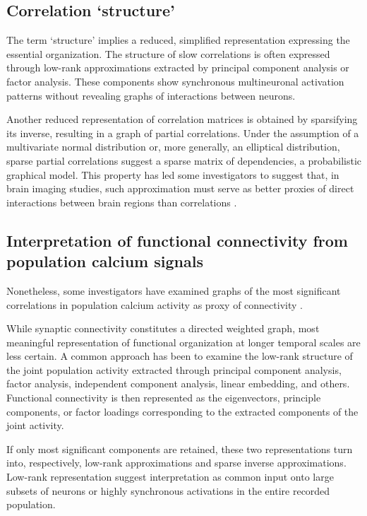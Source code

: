 \documentclass[10pt]{article}
\begin{document}
\subsection*{Correlation `structure'}
The term `structure' implies a reduced, simplified representation expressing the essential organization.  The structure of slow correlations is often expressed through low-rank approximations extracted by principal component analysis or factor analysis. These components show synchronous multineuronal activation patterns without revealing graphs of interactions between neurons. 

Another reduced representation of correlation matrices is obtained by sparsifying its inverse, resulting in a graph of partial correlations. Under the assumption of a multivariate normal distribution or, more generally, an elliptical distribution, sparse partial correlations suggest a sparse matrix of dependencies, a probabilistic graphical model. This property has led some investigators to suggest that, in brain imaging studies, such approximation must serve as better proxies of direct interactions between brain regions than correlations \cite{Varoquaux:2012,Ryali:2012}. 


\subsection*{Interpretation of functional connectivity from population calcium signals}
Nonetheless, some investigators have examined graphs of the most significant correlations in population calcium activity as proxy of connectivity \cite{Malmersjo:2013}.  

While synaptic connectivity constitutes a directed weighted graph, most meaningful representation of functional organization at longer temporal scales are less certain. A common approach has been to examine the low-rank structure of the joint population activity extracted through principal component analysis, factor analysis, independent component analysis, linear embedding, and others. Functional connectivity is then represented as the eigenvectors, principle components, or factor loadings corresponding to the extracted components of the joint activity. 

If only most significant components are retained, these two representations turn into, respectively, low-rank approximations and sparse inverse approximations. Low-rank representation suggest interpretation as common input onto large subsets of neurons or highly synchronous activations in the entire recorded population. 
\end{document}
